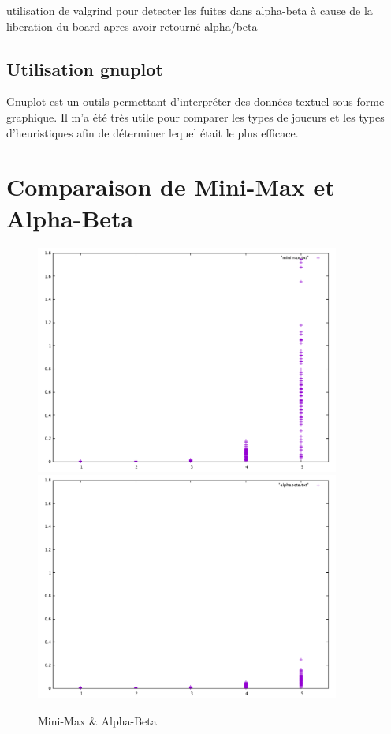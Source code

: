\documentclass{report}
\begin{document}
utilisation de valgrind pour detecter les fuites dans alpha-beta à cause de la liberation du board apres avoir retourné alpha/beta

\section{Utilisation gnuplot}
Gnuplot est un outils permettant d'interpréter des données textuel sous forme graphique. Il m'a été très utile pour comparer les types de joueurs et les types d'heuristiques afin de déterminer lequel était le plus efficace.

\appendix
\chapter{Comparaison de Mini-Max et Alpha-Beta}
\begin{figure}[ht]
\centering
\includegraphics[width=10cm,keepaspectratio]{minimax.pdf}
\includegraphics[width=10cm,keepaspectratio]{alphabeta.pdf}
\begin{center}
    \caption{Mini-Max \& Alpha-Beta}
\end{center}
\end{figure}
\end{document}
